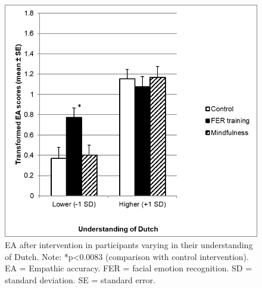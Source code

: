 \documentclass[authordate, empirical, issue]{jote-new-article}
\begin{document}
\begin{figure}[h!]
  \begin{fullwidth}
    \centering
    \includegraphics[width=0.9\linewidth]{media/image1.png}
    \caption{EA after intervention in participants varying in their understanding of Dutch. Note: *p<0.0083 (comparison with control intervention). EA = Empathic accuracy. FER = facial emotion recognition. SD = standard deviation. SE = standard error.}

    \label{fig:rId12}

  \end{fullwidth}
\end{figure}
\end{document}
